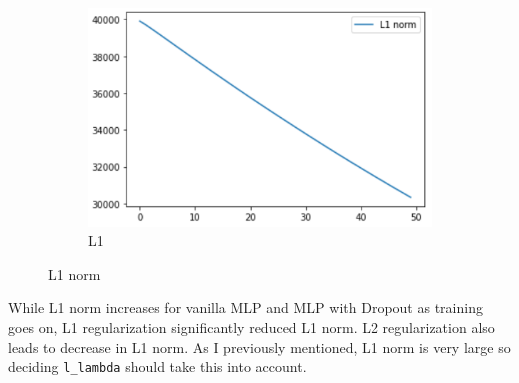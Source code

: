 \documentclass[11pt]{article}
\begin{document}
\begin{figure}[H]
\begin{subfigure}[H]{0.5\textwidth}
        \end{subfigure}
        \begin{subfigure}[H]{0.5\textwidth}
            \includegraphics[width=1\linewidth]{img/L1/l1.PNG}\caption{L1}
        \end{subfigure}
        \caption{L1 norm}
        \label{fig10}
    \end{figure}
    While L1 norm increases for vanilla MLP and MLP with Dropout as training goes on, L1 regularization significantly reduced L1 norm. L2 regularization also leads to decrease in L1 norm. As I previously mentioned, L1 norm is very large so deciding \texttt{l\_lambda} should take this into account.
\end{document}
